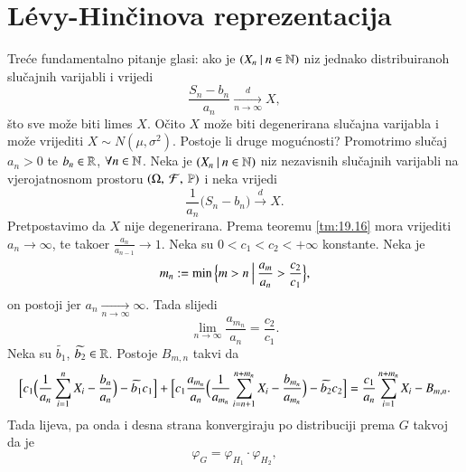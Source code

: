 
\chapter{L\' evy-Hin\v cinova reprezentacija}

Tre\' ce fundamentalno pitanje glasi: ako je $({X_n} \: | \: {n \in \mathbb{N}})$ niz jednako distribuiranoh slu\v cajnih varijabli i vrijedi
\begin{equation*}
    \frac{S_n - b_n}{a_n} \xrightarrow[n \to \infty]{d} X,
\end{equation*}
\v sto sve mo\v ze biti limes $X$.
O\v cito $X$ mo\v ze biti degenerirana slu\v cajna varijabla i mo\v ze vrijediti $X \sim N(\mu, \sigma^2)$.
Postoje li druge mogu\' cnosti?
Promotrimo slu\v caj $a_n > 0$ te $b_n \in \mathbb{R}$, $\forall n \in \mathbb{N}$.
Neka je $({X_n} \: | \: {n \in \mathbb{N}})$ niz nezavisnih slu\v cajnih varijabli na vjerojatnosnom prostoru $(\Omega, \: \mathcal{F}, \: \mathbb{P})$ i neka vrijedi
\begin{equation*}
    \frac{1}{a_n} \big( S_n - b_n \big) \xrightarrow{d} X.
\end{equation*} 
Pretpostavimo da $X$ nije degenerirana.
Prema teoremu \ref{tm:19.16} mora vrijediti $a_n \to \infty$, te tako\dj er $\frac{a_n}{a_{n - 1}} \to 1$.
Neka su $0 < c_1 < c_2 < +\infty$ konstante.
Neka je
\begin{equation*}
    m_n := \min \Big\{ {m > n} \: \Big| \: {\frac{a_m}{a_n} > \frac{c_2}{c_1}} \Big\},
\end{equation*}
on postoji jer $a_n \xrightarrow[n \to \infty]{} \infty$.
Tada slijedi
\begin{equation*}
    \lim\limits_{n \to \infty} \frac{a_{m_n}}{a_n} = \frac{c_2}{c_1}.
\end{equation*}
Neka su $\widetilde{b_1}$, $\widetilde{b_2} \in \mathbb{R}$.
Postoje $B_{m, n}$ takvi da
\begin{equation*}
    \Big[c_1 \Big( \frac{1}{a_n} \sum\limits_{i = 1}^{n} X_i - \frac{b_n}{a_n} \Big) - \widetilde{b_1} c_1 \Big]
    + \Big[ c_1 \frac{a_{m_n}}{a_n} \Big( \frac{1}{a_{m_n}} \sum\limits_{i = n + 1}^{n + m_n} X_i - \frac{b_{m_n}}{a_{m_n}} \Big) - \widetilde{b_2} c_2 \Big]
    = \frac{c_1}{a_n} \sum\limits_{i = 1}^{n + m_n} X_i - B_{m, n}.
\end{equation*}
Tada lijeva, pa onda i desna strana konvergiraju po distribuciji prema $G$ takvoj da je
\begin{equation*}
    \varphi_G = \varphi_{H_1} \cdot \varphi_{H_2},
\end{equation*}
